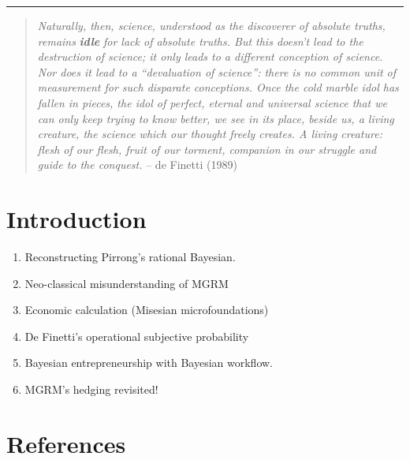 \documentclass[
  letterpaper,
  DIV=11,
  numbers=noendperiod]{scrartcl}
\providecommand{\tightlist}{%
  \setlength{\itemsep}{0pt}\setlength{\parskip}{0pt}}\usepackage{longtable,booktabs,array}
\begin{document}
\begin{center}\rule{0.5\linewidth}{0.5pt}\end{center}

\begin{quote}
\emph{Naturally, then, science, understood as the discoverer of absolute
truths, remains} \textbf{\emph{idle}} \emph{for lack of absolute truths.
But this doesn't lead to the destruction of science; it only leads to a
different conception of science. Nor does it lead to a ``devaluation of
science'': there is no common unit of measurement for such disparate
conceptions. Once the cold marble idol has fallen in pieces, the idol of
perfect, eternal and universal science that we can only keep trying to
know better, we see in its place, beside us, a living creature, the
science which our thought freely creates. A living creature: flesh of
our flesh, fruit of our torment, companion in our struggle and guide to
the conquest.} -- de Finetti (1989)
\end{quote}

\newpage

\section{Introduction}\label{introduction}

\begin{enumerate}
\def\labelenumi{\arabic{enumi}.}
\tightlist
\item
  Reconstructing Pirrong's rational Bayesian.
\item
  Neo-classical misunderstanding of MGRM
\item
  Economic calculation (Misesian microfoundations)
\item
  De Finetti's operational subjective probability
\item
  Bayesian entrepreneurship with Bayesian workflow.
\item
  MGRM's hedging revisited!
\end{enumerate}

\newpage

\section*{References}\label{references}
\end{document}
